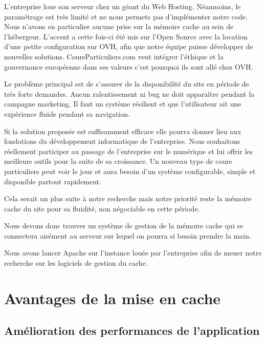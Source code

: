 \documentclass{article}
\begin{document}
L'entreprise loue son serveur chez un géant du Web Hosting. Néanmoins, le paramétrage est très limité et ne nous permets pas d'implémenter notre code.
Nous n'avons en particulier aucune prise sur la mémoire cache au sein de l'hébergeur. 
L'accent a cette fois-ci été mis sur l'Open Source avec la location d'une petite configuration sur OVH, afin que notre équipe puisse développer de nouvelles solutions.
CoursParticuliers.com veut intégrer l'éthique et la gouvernance européenne dans ses valeurs c'est pourquoi ils sont allé chez OVH.

Le problème principal est de s'assurer de la disponibilité du site en période de très forte demandes. 
Aucun ralentissement ni bug ne doit apparaître pendant la campagne marketing. Il faut un système résilient et que l'utilisateur ait une expérience fluide pendant sa navigation.

Si la solution proposée est suffisamment efficace elle pourra donner lieu aux fondations du développement informatique de l'entreprise.
Nous souhaitons réellement participer au passage de l'entreprise sur le numérique et lui offrir les meilleurs outils pour la suite de sa croissance.
Un nouveau type de cours particuliers peut voir le jour et aura besoin d'un système configurable, simple et disponible partout rapidement.

Cela serait un plus suite à notre recherche mais notre priorité reste la mémoire cache du site pour sa fluidité, non négociable en cette période.

Nous devons donc trouver un système de gestion de la mémoire cache qui se connectera aisément au serveur sur lequel on pourra si besoin prendre la main.

Nous avons lancer Apache sur l'instance louée par l'entreprise afin de mener notre recherche sur les logiciels de gestion du cache.


\section{Avantages de la mise en cache}

\subsection{Amélioration des performances de l'application}
\end{document}
